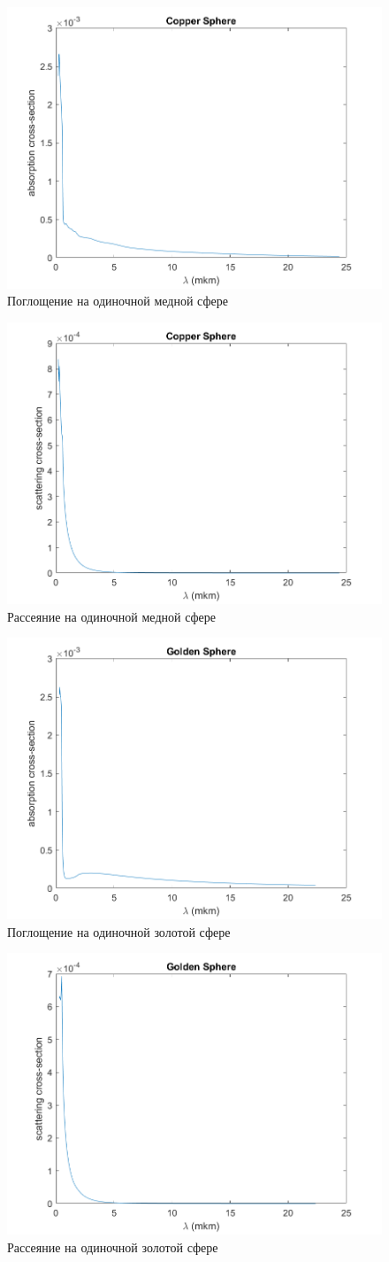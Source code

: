 \begin{figure}[h!]
	\centering
	\includegraphics[width=0.5\linewidth]{singleCopperSphereAbsorptionSection}
	\caption{Поглощение на одиночной медной сфере}
	\label{fig:singleCopperSphereAbsorptionSection}
\end{figure}
\begin{figure}[h!]
	\centering
	\includegraphics[width=0.5\linewidth]{singleCopperSphereCrossSection}
	\caption{Рассеяние на одиночной медной сфере}
	\label{fig:singleCopperSphereCrossSection}
\end{figure}
\begin{figure}[h!]
	\centering
	\includegraphics[width=0.5\linewidth]{singleGoldSphereAbsorptionSection}
	\caption{Поглощение на одиночной золотой сфере}
	\label{fig:singleGoldSphereAbsorptionSection}
\end{figure}
\begin{figure}[h!]
	\centering
	\includegraphics[width=0.5\linewidth]{singleGoldSphereCrossSection}
	\caption{Рассеяние на одиночной золотой сфере}
	\label{fig:singleGoldSphereCrossSection}
\end{figure}
